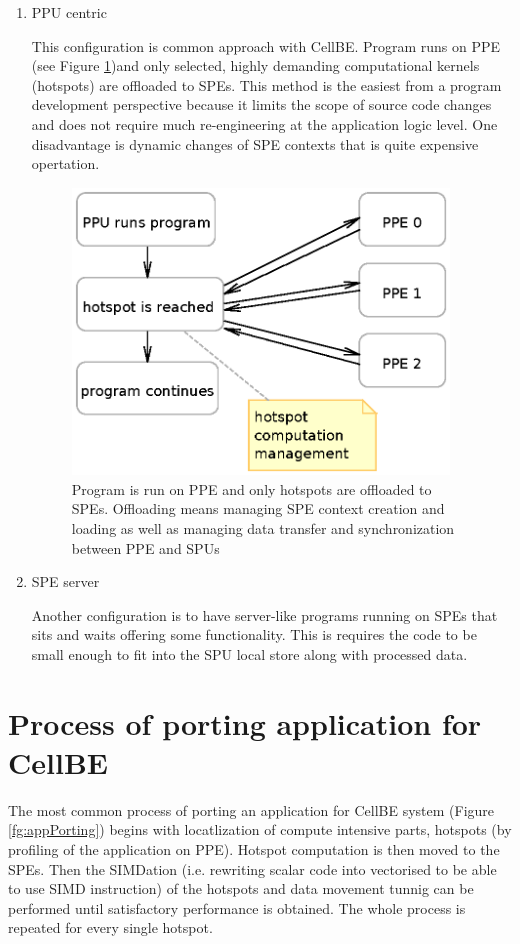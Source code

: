 \begin{enumerate}
\item PPU centric
\par
This configuration is common approach with CellBE. Program runs on PPE (see Figure \ref{fg:PPUCentricModel})and only selected, highly demanding computational kernels (hotspots) are offloaded to SPEs. This method is the easiest from a program development perspective because it limits the scope of source code changes and does not require much re-engineering at the application logic level. One disadvantage is dynamic changes of SPE contexts that is quite expensive opertation.

\begin{figure}
    \centering
    \includegraphics[width=10cm]{data/PPUCentricModel.eps}
    \caption[PPU centric configuration]{Program is run on PPE and only hotspots are offloaded to SPEs. Offloading means managing SPE context creation and loading as well as managing data transfer and synchronization between PPE and SPUs}
    \label{fg:PPUCentricModel}
\end{figure}

\item SPE server
\par
Another configuration is to have server-like programs running on SPEs that sits and waits offering some functionality. This is requires the code to be small enough to fit into the SPU local store along with processed data.

\end{enumerate}

\section {Process of porting application for CellBE}

\par
The most common process of porting an application for CellBE system (Figure \ref{fg:appPorting}) begins with locatlization of compute intensive parts, hotspots (by profiling of the application on PPE). Hotspot computation is then moved to the SPEs. Then the SIMDation (i.e. rewriting scalar code into vectorised to be able to use SIMD instruction) of the hotspots and data movement tunnig can be performed until satisfactory performance is obtained. The whole process is repeated for every single hotspot.

